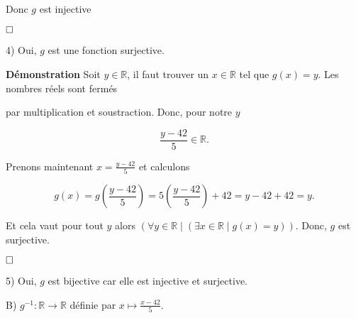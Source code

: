 \documentclass{article}
\begin{document}
Donc $g$ est injective

$\hfill \square$

4) Oui, $g$ est une fonction surjective.

\textbf{Démonstration} Soit $y \in \mathbb{R}$, il faut trouver un $x \in \mathbb{R}$ tel que $g(x) = y$. Les nombres réels sont fermés 

par multiplication et soustraction. Donc, pour notre $y$

$$ \frac{y - 42}{5} \in \mathbb{R}. $$

Prenons maintenant $x = \frac{y - 42}{5}$ et calculons

$$ g(x) = g\left(\frac{y - 42}{5}\right) = 5\left(\frac{y - 42}{5}\right) + 42 = y - 42 + 42 = y. $$

Et cela vaut pour tout $y$ alors $( \forall y \in \mathbb{R} \mid ( \exists x \in \mathbb{R} \mid g(x) = y ) )$. Donc, $g$ est surjective.

$\hfill \square$

5) Oui, $g$ est bijective car elle est injective et surjective.

\vspace{0.5cm}

B) $g^{-1} : \mathbb{R} \longrightarrow \mathbb{R}$ définie par $x \longmapsto \frac{x - 42}{5}$.
\end{document}
